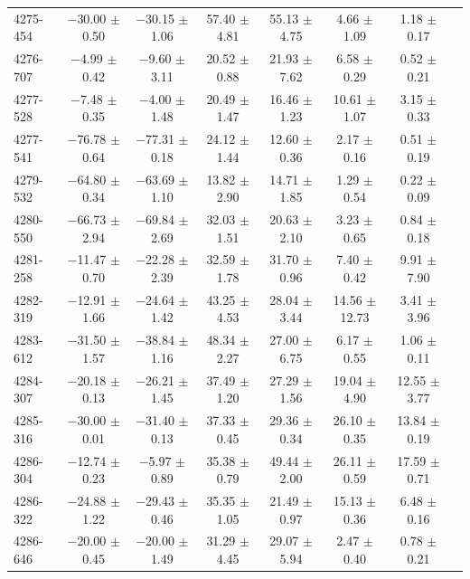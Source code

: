 \documentclass[a4paper,fleqn,usenatbib]{mnras}     %
\begin{document}
\begin{longtable}{l c c c c c c c }
4275-454   &   $-$30.00 $\pm$ 0.50   &   $-$30.15 $\pm$ 1.06   &    57.40 $\pm$ 4.81   &  55.13 $\pm$ 4.75   &   4.66 $\pm$ 1.09   &   1.18 $\pm$ 0.17  \\
4276-707   &    $-$4.99 $\pm$ 0.42   &    $-$9.60 $\pm$ 3.11   &    20.52 $\pm$ 0.88   &  21.93 $\pm$ 7.62   &   6.58 $\pm$ 0.29   &   0.52 $\pm$ 0.21  \\
4277-528   &    $-$7.48 $\pm$ 0.35   &    $-$4.00 $\pm$ 1.48   &    20.49 $\pm$ 1.47   &  16.46 $\pm$ 1.23   &  10.61 $\pm$ 1.07   &   3.15 $\pm$ 0.33  \\
4277-541   &   $-$76.78 $\pm$ 0.64   &   $-$77.31 $\pm$ 0.18   &    24.12 $\pm$ 1.44   &  12.60 $\pm$ 0.36   &   2.17 $\pm$ 0.16   &   0.51 $\pm$ 0.19  \\
4279-532   &   $-$64.80 $\pm$ 0.34   &   $-$63.69 $\pm$ 1.10   &    13.82 $\pm$ 2.90   &  14.71 $\pm$ 1.85   &   1.29 $\pm$ 0.54   &   0.22 $\pm$ 0.09  \\
4280-550   &   $-$66.73 $\pm$ 2.94   &   $-$69.84 $\pm$ 2.69   &    32.03 $\pm$ 1.51   &  20.63 $\pm$ 2.10   &   3.23 $\pm$ 0.65   &   0.84 $\pm$ 0.18  \\
4281-258   &   $-$11.47 $\pm$ 0.70   &   $-$22.28 $\pm$ 2.39   &    32.59 $\pm$ 1.78   &  31.70 $\pm$ 0.96   &   7.40 $\pm$ 0.42   &   9.91 $\pm$ 7.90  \\
4282-319   &   $-$12.91 $\pm$ 1.66   &   $-$24.64 $\pm$ 1.42   &    43.25 $\pm$ 4.53   &  28.04 $\pm$ 3.44   &  14.56 $\pm$12.73   &   3.41 $\pm$ 3.96  \\
4283-612   &   $-$31.50 $\pm$ 1.57   &   $-$38.84 $\pm$ 1.16   &    48.34 $\pm$ 2.27   &  27.00 $\pm$ 6.75   &   6.17 $\pm$ 0.55   &   1.06 $\pm$ 0.11  \\
4284-307   &   $-$20.18 $\pm$ 0.13   &   $-$26.21 $\pm$ 1.45   &    37.49 $\pm$ 1.20   &  27.29 $\pm$ 1.56   &  19.04 $\pm$ 4.90   &  12.55 $\pm$ 3.77  \\
4285-316   &   $-$30.00 $\pm$ 0.01   &   $-$31.40 $\pm$ 0.13   &    37.33 $\pm$ 0.45   &  29.36 $\pm$ 0.34   &  26.10 $\pm$ 0.35   &  13.84 $\pm$ 0.19  \\
4286-304   &   $-$12.74 $\pm$ 0.23   &    $-$5.97 $\pm$ 0.89   &    35.38 $\pm$ 0.79   &  49.44 $\pm$ 2.00   &  26.11 $\pm$ 0.59   &  17.59 $\pm$ 0.71  \\
4286-322   &   $-$24.88 $\pm$ 1.22   &   $-$29.43 $\pm$ 0.46   &    35.35 $\pm$ 1.05   &  21.49 $\pm$ 0.97   &  15.13 $\pm$ 0.36   &   6.48 $\pm$ 0.16  \\
4286-646   &   $-$20.00 $\pm$ 0.45   &   $-$20.00 $\pm$ 1.49   &    31.29 $\pm$ 4.45   &  29.07 $\pm$ 5.94   &   2.47 $\pm$ 0.40   &   0.78 $\pm$ 0.21  \\

\end{longtable}
\end{document}
